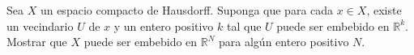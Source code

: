 
\item Sea \( X \) un espacio compacto de Hausdorff. Suponga que para cada \( x \in X \), existe un vecindario \( U \) de \( x \) y un entero positivo \( k \) tal que \( U \) puede ser embebido en \( \mathbb{R}^k \). Mostrar que \( X \) puede ser embebido en \( \mathbb{R}^N \) para algún entero positivo \( N \).
